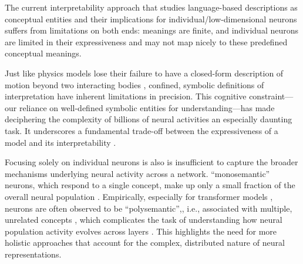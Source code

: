 The current interpretability approach that studies language-based descriptions as conceptual entities and their implications for individual/low-dimensional neurons suffers from limitations on both ends: meanings are finite, and individual neurons are limited in their expressiveness and may not map nicely to these predefined conceptual meanings. 

Just like physics models lose their failure to have a closed-form description of motion beyond two interacting bodies \cite{tao_e_2012}, confined, symbolic definitions of interpretation have inherent limitations in precision. This cognitive constraint—our reliance on well-defined symbolic entities for understanding—has made deciphering the complexity of billions of neural activities an especially daunting task. It underscores a fundamental trade-off between the expressiveness of a model and its interpretability \cite{wang2024largelanguagemodelsinterpretable}.

Focusing solely on individual neurons is also is insufficient to capture the broader mechanisms underlying neural activity across a network. ``monosemantic'' neurons, which respond to a single concept, make up only a small fraction of the overall neural population \cite{radford2017learninggeneratereviewsdiscovering, elhage2022toy, wang2022interpretabilitywildcircuitindirect, dai2022knowledge, voita2023neuron,miller2023neuron}. Empirically, especially for transformer models \cite{elhage2022toy}, neurons are often observed to be ``polysemantic'',, i.e., associated with multiple, unrelated concepts \cite{mu2021compositionalexplanationsneurons, elhage2022toy, olah2020circuits}, which complicates the task of understanding how neural population activity evolves across layers \cite{elhage2022toy, gurnee2023findingneuronshaystackcase}. This highlights the need for more holistic approaches that account for the complex, distributed nature of neural representations.



